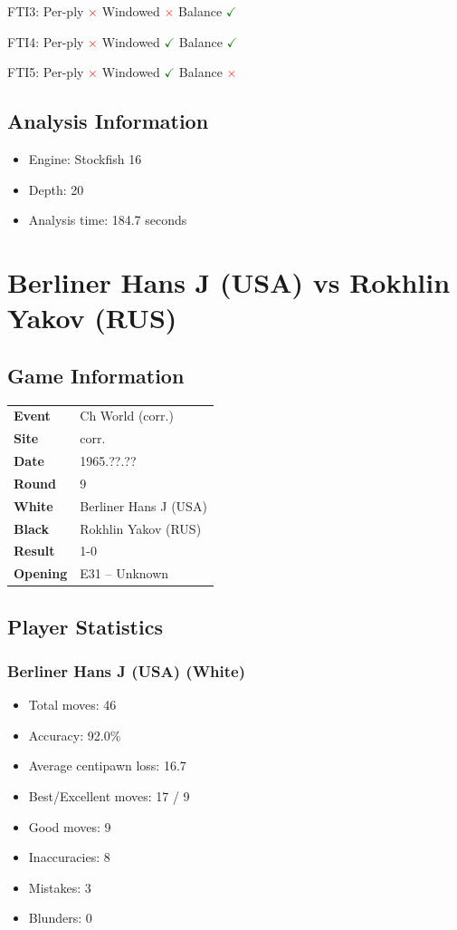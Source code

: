 \documentclass[11pt]{book}
\begin{document}
FTI3: Per-ply \textcolor{red}{$\times$} \quad Windowed \textcolor{red}{$\times$} \quad Balance \textcolor{green}{$\checkmark$}

FTI4: Per-ply \textcolor{red}{$\times$} \quad Windowed \textcolor{green}{$\checkmark$} \quad Balance \textcolor{green}{$\checkmark$}

FTI5: Per-ply \textcolor{red}{$\times$} \quad Windowed \textcolor{green}{$\checkmark$} \quad Balance \textcolor{red}{$\times$}

\section{Analysis Information}
\begin{itemize}
\item Engine: Stockfish 16
\item Depth: 20
\item Analysis time: 184.7 seconds
\end{itemize}

\chapter{Berliner Hans J (USA) vs Rokhlin Yakov (RUS)}

\section{Game Information}
\begin{tabular}{ll}
\textbf{Event} & Ch World (corr.) \\
\textbf{Site} & corr. \\
\textbf{Date} & 1965.??.?? \\
\textbf{Round} & 9 \\
\textbf{White} & Berliner Hans J (USA) \\
\textbf{Black} & Rokhlin Yakov (RUS) \\
\textbf{Result} & 1-0 \\
\textbf{Opening} & E31 -- Unknown \\
\end{tabular}

\section{Player Statistics}

\subsection{Berliner Hans J (USA) (White)}
\begin{itemize}
\item Total moves: 46
\item Accuracy: 92.0\%
\item Average centipawn loss: 16.7
\item Best/Excellent moves: 17 / 9
\item Good moves: 9
\item Inaccuracies: 8
\item Mistakes: 3
\item Blunders: 0
\end{itemize}
\end{document}
